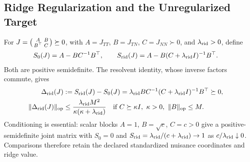 \subsection{Ridge Regularization and the Unregularized Target}
\label{app:ridge-unregularized}
For $J=\begin{psmallmatrix}A&B\\B^\top&C\end{psmallmatrix}\succeq0$, with $A=J_{TT}$, $B=J_{TN}$, $C=J_{NN}\succ0$, and $\lambda_{\mathrm{rid}}>0$, define
\begin{equation}
S_0(J)=A-BC^{-1}B^\top,\qquad
S_{\mathrm{rid}}(J)=A-B(C+\lambda_{\mathrm{rid}}I)^{-1}B^\top.
\label{eq:appB-schur-operators}
\end{equation}
Both are positive semidefinite. The resolvent identity, whose inverse factors commute, gives
\begin{equation}
\begin{aligned}
\Delta_{\mathrm{rid}}(J)&:=S_{\mathrm{rid}}(J)-S_0(J)
=\lambda_{\mathrm{rid}}BC^{-1}(C+\lambda_{\mathrm{rid}}I)^{-1}B^\top\succeq0,\\
\lVert\Delta_{\mathrm{rid}}(J)\rVert_{\mathrm{op}}
&\le\frac{\lambda_{\mathrm{rid}}M^2}{\kappa(\kappa+\lambda_{\mathrm{rid}})}
\quad\text{if }C\succeq\kappa I,\ \kappa>0,\ \lVert B\rVert_{\mathrm{op}}\le M.
\end{aligned}
\label{eq:ridge-exact-gap}
\end{equation}
Conditioning is essential: scalar blocks $A=1$, $B=\sqrt c$, $C=c>0$ give a positive-semidefinite joint matrix with $S_0=0$ and $S_{\mathrm{rid}}=\lambda_{\mathrm{rid}}/(c+\lambda_{\mathrm{rid}})\to1$ as $c/\lambda_{\mathrm{rid}}\downarrow0$. Comparisons therefore retain the declared standardized nuisance coordinates and ridge value.

